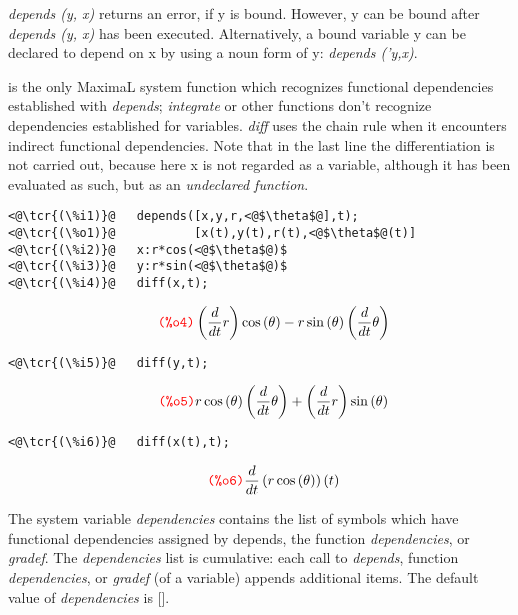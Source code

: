 \documentclass[../Maxima_Workbook.tex]{subfiles}
\begin{document}
\lz \emph{depends (y, x)} returns an error, if y is bound. However, y can be bound after \emph{depends (y, x)} has been executed. Alternatively, a bound variable y can be declared to depend on x by using a noun form of y: \emph{depends ('y,x)}.

\lz {} is the only MaximaL system function which recognizes functional dependencies established with \emph{depends}; \emph{integrate} or other functions don't recognize dependencies established for variables. \emph{diff} uses the chain rule when it encounters indirect functional dependencies. Note that in the last line the differentiation is not carried out, because here x is not regarded as a variable, although it has been evaluated as such, but as an \emph{undeclared function}.

\lz \begin{small}
\color{blue} \leqn
\begin{lstlisting}
<@\tcr{(\%i1)}@   depends([x,y,r,<@$\theta$@],t);
<@\tcr{(\%o1)}@		      [x(t),y(t),r(t),<@$\theta$@(t)]
<@\tcr{(\%i2)}@   x:r*cos(<@$\theta$@)$  
<@\tcr{(\%i3)}@   y:r*sin(<@$\theta$@)$
<@\tcr{(\%i4)}@   diff(x,t);
\end{lstlisting}
\vspace{-4mm} \[\tag*{\tcr{\ttfamily (\%o4)}} \left( \frac{d}{d t} r\right)  \cos{\left( \theta \right) }-r \sin{\left( \theta \right) } \left( \frac{d}{d t} \theta \right) \]
\vspace{-7mm} \begin{lstlisting}
<@\tcr{(\%i5)}@   diff(y,t);
\end{lstlisting}
\vspace{-4mm} \[\tag*{\tcr{\ttfamily (\%o5)}} r \cos{\left( \theta \right) } \left( \frac{d}{d t} \theta \right) +\left( \frac{d}{d t} r\right)  \sin{\left( \theta \right) } \]
\vspace{-7mm} \begin{lstlisting}
<@\tcr{(\%i6)}@   diff(x(t),t);
\end{lstlisting}
\vspace{-4mm} \[\tag*{\tcr{\ttfamily (\%o6)}} \frac{d}{d t} \left( r \cos{\left( \theta \right) }\right) (t) \]
\color{black} \reqn
\end{small} \vspace{-4mm}

\lzz {} \hfill {}

\lz The system variable \emph{dependencies} contains the list of symbols which have functional dependencies assigned by depends, the function \emph{dependencies}, or \emph{gradef}. The \emph{dependencies} list is cumulative: each call to \emph{depends}, function \emph{dependencies}, or \emph{gradef} (of a variable) appends additional items. The default value of \emph{dependencies} is [].
\end{document}
